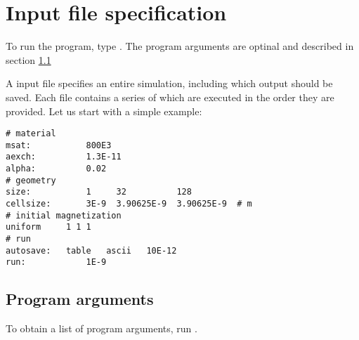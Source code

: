 \section{Input file specification}

To run the program, type \prog {} . The program arguments are optinal and described in section \ref{arguments}

A \prog input file specifies an entire simulation, including which output should be saved. Each file contains a series of  which are executed in the order they are provided. Let us start with a simple example:


\begin{verbatim}
# material
msat:       	800E3 
aexch:      	1.3E-11
alpha:      	0.02
# geometry 
size:       	1     32          128    
cellsize:   	3E-9  3.90625E-9  3.90625E-9  # m
# initial magnetization
uniform		1 1 1
# run
autosave:	table	ascii	10E-12
run:          	1E-9
\end{verbatim}


\subsection{Program arguments}\label{arguments}

To obtain a list of program arguments, run \prog {}.
